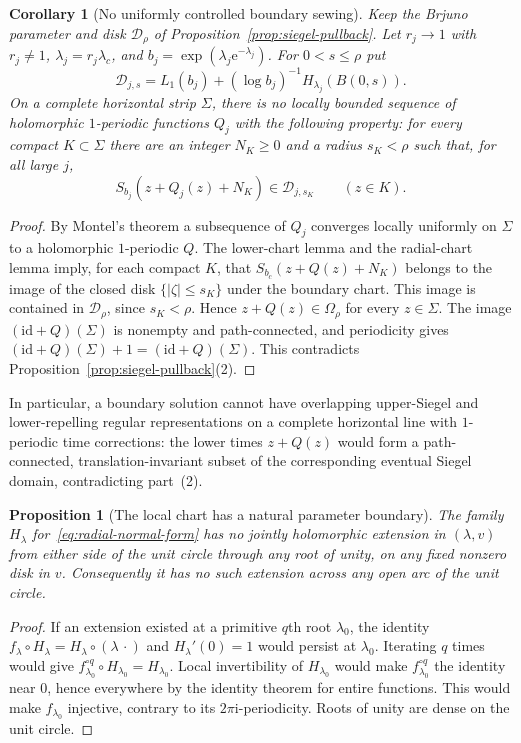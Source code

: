 \documentclass[11pt,a4paper]{article}
\newtheorem{proposition}[theorem]{Proposition}
\newtheorem{corollary}[theorem]{Corollary}
\theoremstyle{definition}
\newcommand{\eee}{\mathrm{e}}
\newcommand{\ii}{\mathrm{i}}
\begin{document}
\begin{corollary}[No uniformly controlled boundary sewing]
\label{cor:no-uniform-sewing}
Keep the Brjuno parameter and disk $\mathcal D_\rho$ of
Proposition~\ref{prop:siegel-pullback}.  Let $r_j\to1$ with $r_j\ne1$,
$\lambda_j=r_j\lambda_c$, and
$b_j=\exp(\lambda_j\eee^{-\lambda_j})$.  For $0<s\le\rho$ put
\[
 \mathcal D_{j,s}=L_1(b_j)+(\log b_j)^{-1}H_{\lambda_j}(B(0,s)).
\]
On a complete horizontal strip $\Sigma$, there is no locally bounded
sequence of holomorphic $1$-periodic functions $Q_j$ with the following
property: for every compact $K\subset\Sigma$ there are an integer
$N_K\ge0$ and a radius $s_K<\rho$ such that, for all large $j$,
\[
 S_{b_j}(z+Q_j(z)+N_K)\in\mathcal D_{j,s_K}
 \qquad(z\in K).
\]
\end{corollary}

\begin{proof}
By Montel's theorem a subsequence of $Q_j$ converges locally uniformly
on $\Sigma$ to a holomorphic $1$-periodic $Q$.  The lower-chart lemma and
the radial-chart lemma imply, for each compact $K$, that
$S_{b_c}(z+Q(z)+N_K)$ belongs to the image of the closed disk
$\{|\zeta|\le s_K\}$ under the boundary chart.  This image is contained
in $\mathcal D_\rho$, since $s_K<\rho$.  Hence
$z+Q(z)\in\Omega_\rho$ for every $z\in\Sigma$.
The image $(\mathrm{id}+Q)(\Sigma)$ is nonempty and path-connected, and
periodicity gives $(\mathrm{id}+Q)(\Sigma)+1=(\mathrm{id}+Q)(\Sigma)$.
This contradicts Proposition~\ref{prop:siegel-pullback}(2).
\end{proof}

In particular, a boundary solution cannot have overlapping upper-Siegel
and lower-repelling regular representations on a complete horizontal
line with $1$-periodic time corrections: the lower times
$z+Q(z)$ would form a path-connected, translation-invariant subset of
the corresponding eventual Siegel domain, contradicting part~(2).

\begin{proposition}[The local chart has a natural parameter boundary]
\label{prop:chart-boundary}
The family $H_\lambda$ for~\eqref{eq:radial-normal-form} has no jointly
holomorphic extension in $(\lambda,v)$ from either side of the unit circle
through any root of unity, on any fixed nonzero disk in $v$.  Consequently
it has no such extension across any open arc of the unit circle.
\end{proposition}

\begin{proof}
If an extension existed at a primitive $q$th root $\lambda_0$, the
identity $f_\lambda\circ H_\lambda=H_\lambda\circ(\lambda\,\cdot)$
and $H_\lambda'(0)=1$ would persist at $\lambda_0$.  Iterating $q$ times
would give $f_{\lambda_0}^{\circ q}\circ H_{\lambda_0}=H_{\lambda_0}$.
Local invertibility of $H_{\lambda_0}$ would make
$f_{\lambda_0}^{\circ q}$ the identity near $0$, hence everywhere by the
identity theorem for entire functions.  This would make $f_{\lambda_0}$
injective, contrary to its $2\pi\ii$-periodicity.  Roots of unity are dense
on the unit circle.
\end{proof}
\end{document}
